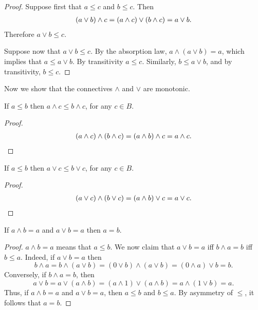 \begin{proof} Suppose first that $a\leq c$ and $b\leq c$.  Then
  \[ \begin{array}{l l} (a\vee b)\wedge c = (a\wedge c)\vee (b\wedge
    c)=a\vee b .\end{array} \] Therefore $a\vee b\leq c$. 

  Suppose now that $a\vee b\leq c$.  By the absorption law, $a\wedge
  (a\vee b)=a$, which implies that $a\leq a\vee b$.  By transitivity
  $a\leq c$.  Similarly, $b\leq a\vee b$, and by transitivity, $b\leq
  c$.  \end{proof}

Now we show that the connectives $\wedge$ and $\vee$ are monotonic.

\begin{prop} If $a\leq b$ then $a\wedge c\leq b\wedge c$, for any
  $c\in B$.  \end{prop}

\begin{proof} 
\[ \begin{array}{l  l  l}
(a\wedge c)\wedge (b\wedge c) = (a\wedge b)\wedge c=a\wedge c
.\end{array} \] \end{proof}

\begin{prop} If $a\leq b$ then $a\vee c\leq b\vee c$, for any $c\in
  B$. \end{prop}

\begin{proof} 
\[ \begin{array}{l  l  l}
(a\vee c)\wedge (b\vee c) = (a\wedge b)\vee c = a\vee c .\end{array} \]
\end{proof}


\begin{prop} If $a\wedge b=a$ and $a\vee b=a$ then $a=b$. \end{prop}

\begin{proof} $a\wedge b=a$ means that $a\leq b$.  We now claim that
  $a\vee b=a$ iff $b\wedge a=b$ iff $b\leq a$.  Indeed, if $a\vee b=a$
  then
$$ b\wedge a = b\wedge (a\vee b)=(0\vee b)\wedge (a\vee b)=(0\wedge
a)\vee b = b .$$
Conversely, if $b\wedge a=b$, then 
$$ a\vee b = a\vee (a\wedge b) = (a\wedge 1)\vee (a\wedge b)= a\wedge
(1\vee b) = a .$$ Thus, if $a\wedge b=a$ and $a\vee b=a$, then $a\leq
b$ and $b\leq a$.  By asymmetry of $\leq$, it follows that
$a=b$. \end{proof}

